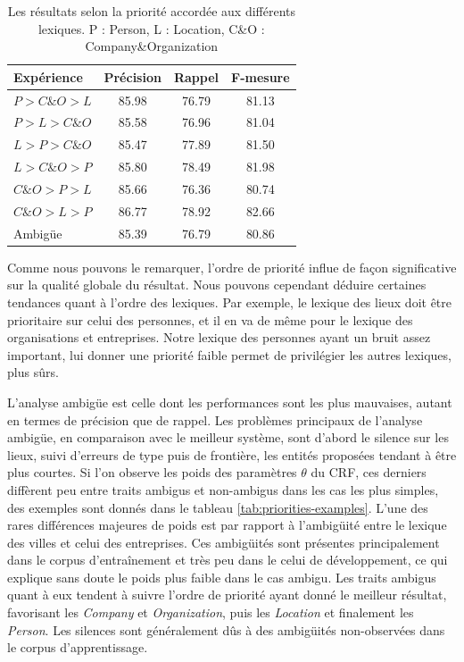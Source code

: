 \documentclass[12pt,a4paper,times,twoside,openright]{report}
\begin{document}
\begin{table}[ht!]
\centering
\begin{tabular}{|l|c|c|c|}
\hline
Expérience   & Précision & Rappel & F-mesure \\
\hline
$P > C\&O > L$ & 85.98     & 76.79  & 81.13 \\
$P > L > C\&O$ & 85.58     & 76.96  & 81.04 \\
$L > P > C\&O$ & 85.47     & 77.89  & 81.50 \\
$L > C\&O > P$ & 85.80     & 78.49  & 81.98 \\
$C\&O > P > L$ & 85.66     & 76.36  & 80.74 \\
$C\&O > L > P$ & 86.77     & 78.92  & 82.66 \\
\hline
Ambigüe      & 85.39     & 76.79  & 80.86 \\
\hline
\end{tabular}
\caption{Les résultats selon la priorité accordée aux différents lexiques. P : Person, L : Location, C\&O : Company\&Organization}
\label{tab:results-ftb-priority}
\end{table}

Comme nous pouvons le remarquer, l'ordre de priorité influe de façon significative sur la qualité globale du résultat. Nous pouvons cependant déduire certaines tendances quant à l'ordre des lexiques. Par exemple, le lexique des lieux doit être prioritaire sur celui des personnes, et il en va de même pour le lexique des organisations et entreprises. Notre lexique des personnes ayant un bruit assez important, lui donner une priorité faible permet de privilégier les autres lexiques, plus sûrs. %

L'analyse ambigüe est celle dont les performances sont les plus mauvaises, autant en termes de précision que de rappel. Les problèmes principaux de l'analyse ambigüe, en comparaison avec le meilleur système, sont d'abord le silence sur les lieux, suivi d'erreurs de type puis de frontière, les entités proposées tendant à être plus courtes. Si l'on observe les poids des paramètres $\theta$ du CRF, ces derniers diffèrent peu entre traits ambigus et non-ambigus dans les cas les plus simples, des exemples sont donnés dans le tableau \ref{tab:priorities-examples}. L'une des rares différences majeures de poids est par rapport à l'ambigüité entre le lexique des villes et celui des entreprises. Ces ambigüités sont présentes principalement dans le corpus d'entraînement et très peu dans le celui de développement, ce qui explique sans doute le poids plus faible dans le cas ambigu. Les traits ambigus quant à eux tendent à suivre l'ordre de priorité ayant donné le meilleur résultat, favorisant les \emph{Company} et \emph{Organization}, puis les \emph{Location} et finalement les \emph{Person}. Les silences sont généralement dûs à des ambigüités non-observées dans le corpus d'apprentissage.
\end{document}
